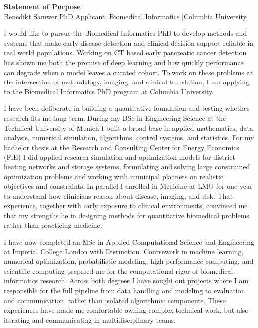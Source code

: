 \documentclass[11pt,a4paper]{article}
\begin{document}
\begin{center}
\Large\textbf{Statement of Purpose}\\[4pt]
\normalsize Benedikt Samwer\quad|\quad PhD Applicant, Biomedical Informatics \quad|\quad Columbia University
\end{center}
I would like to pursue the Biomedical Informatics PhD to develop methods and systems that make early disease detection and clinical decision support reliable in real world populations. Working on CT based early pancreatic cancer detection has shown me both the promise of deep learning and how quickly performance can degrade when a model leaves a curated cohort. To work on these problems at the intersection of methodology, imaging, and clinical translation, I am applying to the Biomedical Informatics PhD program at Columbia University.

I have been deliberate in building a quantitative foundation and testing whether research fits me long term. During my BSc in Engineering Science at the Technical University of Munich I built a broad base in applied mathematics, data analysis, numerical simulation, algorithms, control systems, and statistics. For my bachelor thesis at the Research and Consulting Center for Energy Economics (FfE) I did applied research simulation and optimization models for district heating networks and storage systems, formulating and solving large constrained optimization problems and working with municipal planners on realistic objectives and constraints. In parallel I enrolled in Medicine at LMU for one year to understand how clinicians reason about disease, imaging, and risk. That experience, together with early exposure to clinical environments, convinced me that my strengths lie in designing methods for quantitative biomedical problems rather than practicing medicine.

I have now completed an MSc in Applied Computational Science and Engineering at Imperial College London with Distinction. Coursework in machine learning, numerical optimization, probabilistic modeling, high performance computing, and scientific computing prepared me for the computational rigor of biomedical informatics research. Across both degrees I have sought out projects where I am responsible for the full pipeline from data handling and modeling to evaluation and communication, rather than isolated algorithmic components. These experiences have made me comfortable owning complex technical work, but also iterating and communicating in multidisciplinary teams.
\end{document}
